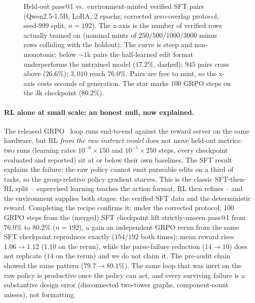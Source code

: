 \documentclass{article}
\begin{document}
\begin{figure}[t]
\centering
{}
\caption{Held-out pass@1 vs.\ environment-minted verified SFT pairs (Qwen2.5-1.5B, LoRA, 2 epochs; corrected zero-overlap protocol, seed-999 split, $n{=}192$). The x-axis is the number of verified rows actually trained on (nominal mints of $250/500/1000/3000$ minus rows colliding with the holdout). The curve is steep and non-monotonic: below ${\sim}1$k pairs the half-learned edit format underperforms the untrained model ($17.2\%$, dashed); $945$ pairs cross above ($26.6\%$); $3{,}010$ reach $76.0\%$. Pairs are free to mint, so the x-axis costs seconds of generation. The star marks $100$ GRPO steps on the $3$k checkpoint ($80.2\%$).}
\label{fig:sftscale}
\end{figure}

\paragraph{RL alone at small scale: an honest null, now explained.} The released GRPO~\cite{grpo} loop runs end-to-end against the reward server on the same hardware, but RL \emph{from the raw instruct model} does not move held-out metrics: two runs (learning rates $10^{-6}\times150$ and $10^{-5}\times250$ steps, every checkpoint evaluated and reported) sit at or below their own baselines. The SFT result explains the failure: the raw policy cannot emit parseable edits on a third of tasks, so the group-relative policy gradient starves. This is the classic SFT-then-RL split -- supervised learning teaches the action format, RL then refines -- and the environment supplies both stages: the verified SFT data and the deterministic reward. Completing the recipe confirms it: under the corrected protocol, $100$ GRPO steps from the (merged) SFT checkpoint lift strictly-unseen pass@1 from $76.0\%$ to $\mathbf{80.2\%}$ ($n{=}192$), a gain an independent GRPO rerun from the same SFT checkpoint reproduces exactly ($154/192$ both times); mean reward rises $1.06\to1.12$ ($1.10$ on the rerun), while the parse-failure reduction ($14\to10$) does not replicate ($14$ on the rerun) and we do not claim it. The pre-audit chain showed the same pattern ($79.7\to89.1\%$). The same loop that was inert on the raw policy is productive once the policy can act, and every surviving failure is a substantive design error (disconnected two-tower graphs, component-count misses), not formatting.
\end{document}
